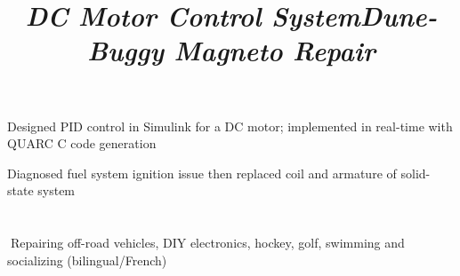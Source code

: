 \documentclass[mm]{res}
\begin{document}
\begin{resume}
\title{\textsl{DC Motor Control System}}
\begin{position}
\tb Designed PID control in Simulink for a DC motor; implemented in real-time with QUARC C code generation
\end{position}


\title{\textsl{Dune-Buggy Magneto Repair}}
\begin{position}
\tb Diagnosed fuel system ignition issue then replaced coil and armature of solid-state system
\end{position}

%



\toprule

\section{\headinginterests}
􏰚\tb Repairing off-road vehicles, DIY electronics, hockey, golf, swimming and socializing (bilingual/French)

\end{resume}
\end{document}

